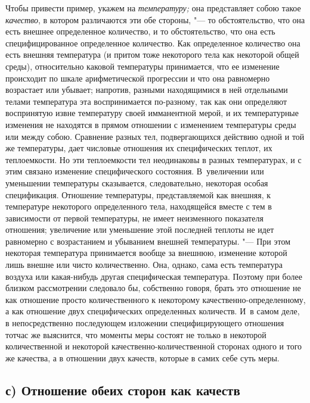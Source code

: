 Чтобы привести пример, укажем на {\em температуру;} она
представляет собою такое {\em качество}, в котором
различаются эти обе стороны, "--- то обстоятельство, что она есть внешнее
определенное количество, и то обстоятельство, что она есть
специфицированное определенное количество. Как определенное количество она
есть внешняя температура (и притом тоже некоторого тела как некоторой общей
среды), относительно каковой температуры принимается, что ее изменение
происходит по шкале арифметической прогрессии и что она равномерно
возрастает или убывает; напротив, разными находящимися в ней отдельными
телами температура эта воспринимается по-разному, так как они определяют
воспринятую извне температуру своей имманентной мерой, и их температурные
изменения не находятся в прямом отношении с изменением температуры среды
или между собою. Сравнение разных тел, подвергающихся действию одной и той
же температуры, дает числовые отношения их специфических теплот, их
теплоемкости. Но эти теплоемкости тел неодинаковы в разных температурах, и
с этим связано изменение специфического состояния. В~увеличении или
уменьшении температуры сказывается, следовательно, некоторая особая
спецификация. Отношение температуры, представляемой как внешняя, к
температуре некоторого определенного тела, находящейся вместе с тем в
зависимости от первой температуры, не имеет неизменного показателя
отношения; увеличение или уменьшение этой последней теплоты не идет
равномерно с возрастанием и убыванием внешней температуры. "--- При этом
некоторая температура принимается вообще за внешнюю, изменение которой лишь
внешне или чисто количественно. Она, однако, сама есть температура воздуха
или какая-нибудь другая специфическая температура. Поэтому при более
близком рассмотрении следовало бы, собственно говоря, брать это отношение
не как отношение просто количественного к некоторому
качественно-определенному, а как отношение двух специфических определенных
количеств. И~в самом деле, в непосредственно последующем изложении
специфицирующего отношения тотчас же выяснится, что моменты меры состоят не
только в некоторой количественной и некоторой качественно-количественной
сторонах одного и того же качества, а в отношении двух качеств, которые в
самих себе суть меры.


\subsection[с) Отношение обеих сторон как качеств]{с) Отношение обеих
сторон как качеств}

